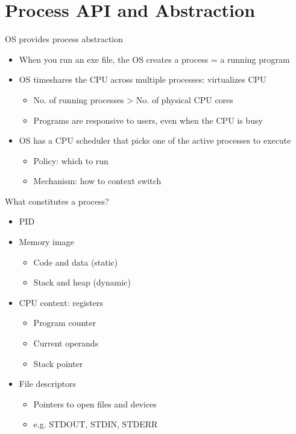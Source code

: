 \documentclass[12pt]{article}
\begin{document}
\section{Process API and Abstraction}

OS provides process abstraction
\begin{itemize}
    \item When you run an exe file, the OS creates a process = a running program
    \item OS timeshares the CPU across multiple processes: virtualizes CPU
    \begin{itemize}
        \item No. of running processes > No. of physical CPU cores
        \item Programs are responsive to users, even when the CPU is busy
    \end{itemize}
    \item OS has a CPU scheduler that picks one of the active processes to execute
    \begin{itemize}
        \item Policy: which to run
        \item Mechanism: how to context switch
    \end{itemize}
\end{itemize}

What constitutes a process?
\begin{itemize}
    \item PID
    \item Memory image
    \begin{itemize}
        \item Code and data (static)
        \item Stack and heap (dynamic)
    \end{itemize}
    \item CPU context: registers
    \begin{itemize}
        \item Program counter
        \item Current operands
        \item Stack pointer
    \end{itemize}
    \item File descriptors
    \begin{itemize}
        \item Pointers to open files and devices
        \item e.g. STDOUT, STDIN, STDERR
    \end{itemize}
\end{itemize}
\end{document}
